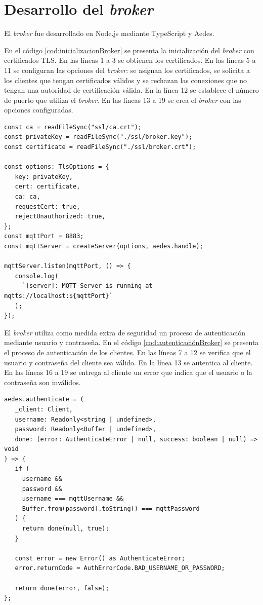 \section{Desarrollo del \emph{broker}}

El \emph{broker} fue desarrollado en Node.js mediante TypeScript y Aedes.

En el código \ref{cod:inicializacionBroker} se presenta la inicialización del \emph{broker} con certificados TLS. En las líneas 1 a 3 se obtienen los certificados. En las líneas 5 a 11 se configuran las opciones del \emph{broker}: se asignan los certificados, se solicita a los clientes que tengan certificados válidos  y se rechazan las conexiones que no tengan una autoridad de certificación \citep{WEBSITE:AUTORIDADDECERTIFICACION} válida. En la línea 12 se establece el número de puerto que utiliza el \emph{broker}. En las líneas 13 a 19 se crea el \emph{broker} con las opciones configuradas.

\begin{lstlisting}[label=cod:inicializacionBroker,caption=Inicialización del \emph{broker} con TLS.]
const ca = readFileSync("ssl/ca.crt");
const privateKey = readFileSync("./ssl/broker.key");
const certificate = readFileSync("./ssl/broker.crt");

const options: TlsOptions = {
   key: privateKey,
   cert: certificate,
   ca: ca,
   requestCert: true,
   rejectUnauthorized: true,
};
const mqttPort = 8883;
const mqttServer = createServer(options, aedes.handle);

mqttServer.listen(mqttPort, () => {
   console.log(
     `[server]: MQTT Server is running at mqtts://localhost:${mqttPort}`
   );
});
\end{lstlisting}

El \emph{broker} utiliza como medida extra de seguridad un proceso de autenticación mediante usuario y contraseña. En el código \ref{cod:autenticaciónBroker} se presenta el proceso de autenticación de los clientes. En las líneas 7 a 12 se verifica que el usuario y contraseña del cliente sea válido. En la línea 13 se autentica al cliente. En las líneas 16 a 19 se entrega  al cliente un error que indica que el usuario o la contraseña son inválidos.

\begin{lstlisting}[label=cod:autenticaciónBroker,caption=Autenticación de clientes.]
aedes.authenticate = (
   _client: Client,
   username: Readonly<string | undefined>,
   password: Readonly<Buffer | undefined>,
   done: (error: AuthenticateError | null, success: boolean | null) => void
) => {
   if (
     username &&
     password &&
     username === mqttUsername &&
     Buffer.from(password).toString() === mqttPassword
   ) {
     return done(null, true);
   }

   const error = new Error() as AuthenticateError;
   error.returnCode = AuthErrorCode.BAD_USERNAME_OR_PASSWORD;

   return done(error, false);
};
\end{lstlisting}

